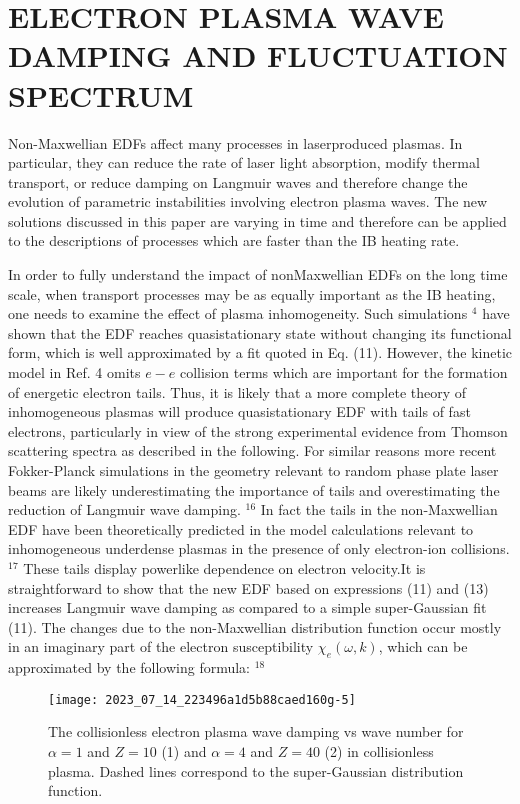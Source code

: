 \documentclass[oneside,onecolumn]{article}
\begin{document}
\begin{sloppypar}
 \section{ELECTRON PLASMA WAVE DAMPING AND FLUCTUATION SPECTRUM}
 Non-Maxwellian EDFs affect many processes in laserproduced plasmas. In particular, they can reduce the rate of laser light absorption, modify thermal transport, or reduce damping on Langmuir waves and therefore change the evolution of parametric instabilities involving electron plasma waves. The new solutions discussed in this paper are varying in time and therefore can be applied to the descriptions of processes which are faster than the IB heating rate.
 
 In order to fully understand the impact of nonMaxwellian EDFs on the long time scale, when transport processes may be as equally important as the IB heating, one needs to examine the effect of plasma inhomogeneity. Such simulations $^{4}$ have shown that the EDF reaches quasistationary state without changing its functional form, which is well approximated by a fit quoted in Eq. (11). However, the kinetic model in Ref. 4 omits $e-e$ collision terms which are important for the formation of energetic electron tails. Thus, it is likely that a more complete theory of inhomogeneous plasmas will produce quasistationary EDF with tails of fast electrons, particularly in view of the strong experimental evidence from Thomson scattering spectra as described in the following. For similar reasons more recent Fokker-Planck simulations in the geometry relevant to random phase plate laser beams are likely underestimating the importance of tails and overestimating the reduction of Langmuir wave damping. ${ }^{16}$ In fact the tails in the non-Maxwellian EDF have been theoretically predicted in the model calculations relevant to inhomogeneous underdense plasmas in the presence of only electron-ion collisions. ${ }^{17}$ These tails display powerlike dependence on electron velocity.It is straightforward to show that the new EDF based on expressions (11) and (13) increases Langmuir wave damping as compared to a simple super-Gaussian fit (11). The changes due to the non-Maxwellian distribution function occur mostly in an imaginary part of the electron susceptibility $\chi_{e}(\omega, k)$, which can be approximated by the following formula: ${ }^{18}$
 
 \begin{figure}[htbp]
 	\centering
 	\texttt{[image: 2023\_07\_14\_223496a1d5b88caed160g-5]}
 	\caption{The collisionless electron plasma wave damping vs wave number for $\alpha=1$ and $Z=10$ (1) and $\alpha=4$ and $Z=40$ (2) in collisionless plasma. Dashed lines correspond to the super-Gaussian distribution function.}
 	\label{figure5}
 \end{figure}
 

\end{sloppypar}
\end{document}
